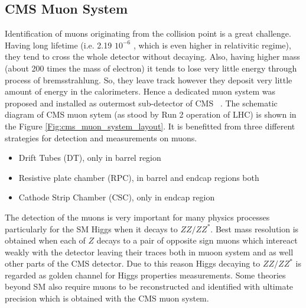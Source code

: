 \subsection{CMS Muon System }
Identification of muons originating from the collision point is a great challenge. Having long lifetime (i.e. 2.19 \times $10^{-6}$ , which is even higher in relativitic regime), they tend to cross the whole detector without decaying. 
Also, having higher mass (about 200 times the mass of electron) it tends to lose very little energy through process of bremsstrahlung. 
So, they leave track however they deposit very little amount of energy in the calorimeters. Hence a dedicated muon system was proposed and installed as outermost sub-detector of CMS ~\cite{cms:muonsystem_TDR}. The schematic diagram of CMS muon sytem (as stood by Run 2 operation of LHC) is shown in the Figure \ref{Fig:cms_muon_system_layout}. It is benefitted from three different strategies for detection and measurements on  muons. 

\begin{itemize}
	\item Drift Tubes (DT), only in barrel region
	\item Resistive plate chamber (RPC), in barrel and endcap regions both %
	\item Cathode Strip Chamber (CSC), only in endcap region
\end{itemize}

The detection of the muons is very important for many physics processes particularly for the SM Higgs when it decays to $ZZ/ZZ^{*}$. 
Best mass resolution is obtained when each of $Z$ decays to a pair of opposite sign muons which intereact weakly with the detector leaving their traces both in muoon system and as well other parts of the CMS detector. Due to this reason Higgs decaying to $ZZ/ZZ^{*}$ is regarded as golden channel for Higgs properties measurements. 
Some theories beyond SM also require muons to be reconstructed and identified with ultimate precision which is obtained with the CMS muon system.

